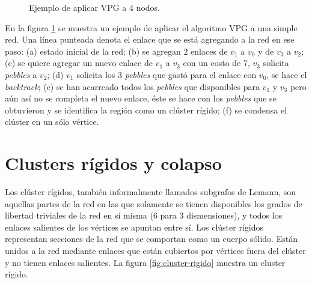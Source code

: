 \begin{figure}
\begin{subfigure}{0.30\textwidth}
\caption{}
\end{subfigure}
\caption{Ejemplo de aplicar VPG a 4 nodos.}
\label{fig:ejemplo-vpg}
\end{figure}

En la figura \ref{fig:ejemplo-vpg} se muestra un ejemplo de aplicar el algoritmo VPG a una simple red. Una línea punteada denota el enlace que se está agregando a la red en ese paso: (a)  estado inicial de la red; (b) se agregan 2 enlaces de $v_1$ a $v_0$ y de $v_3$ a $v_2$; (c) se quiere agregar un nuevo enlace de $v_1$ a $v_3$ con un costo de 7, $v_3$ solicita \emph{pebbles} a $v_2$; (d) $v_1$ solicita los 3 \emph{pebbles} que gastó para el enlace con $v_0$, se hace el \emph{backtrack}; (e) se han acarreado todos los \emph{pebbles} que disponibles para $v_1$ y $v_3$ pero aún así no se completa el nuevo enlace, éste se hace con los \emph{pebbles} que se obtuvieron y se identifica la región como un clúster rígido; (f) se condensa el clúster en un sólo vértice.

\section{Clusters rígidos y colapso} \label{cluster-rigido}

Los clúster rígidos, también informalmente llamados subgrafos de Lemann, son aquellas partes de la red en las que solamente se tienen disponibles los grados de libertad triviales de la red en sí misma (6 para 3 dismensiones), y todos los enlaces salientes de los vértices se apuntan entre sí. Los clúster rígidos representan secciones de la red que se comportan como un cuerpo sólido. Están unidos a la red mediante enlaces que están cubiertos por vértices fuera del clúster y no tienen enlaces salientes. La figura \ref{fig:cluster-rigido} muestra un cluster rígido. 

